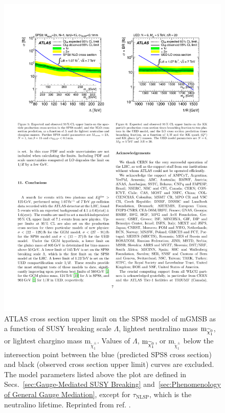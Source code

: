\documentclass[dissertation.tex]{subfiles}
\begin{document}
\begin{figure}
	\centering
	\includegraphics[scale=0.9]{ATLAS_SPS8_limit}
	\caption{ATLAS cross section upper limit on the SPS8 \cite{SPS} model of mGMSB as a function of SUSY breaking scale $\Lambda$, lightest neutralino mass $\mbox{m}_{\widetilde{\chi}_{1}^{0}}$, or lightest chargino mass $\mbox{m}_{\widetilde{\chi}_{1}^{\pm}}$.  Values of $\Lambda$, $\mbox{m}_{\widetilde{\chi}_{1}^{0}}$, or $\mbox{m}_{\widetilde{\chi}_{1}^{\pm}}$ below the intersection point between the blue (predicted SPS8 cross section) and black (observed cross section upper limit) curves are excluded.  The model parameters listed above the plot are defined in Secs.~\ref{sec:Gauge-Mediated SUSY Breaking} and~\ref{sec:Phenomenology of General Gauge Mediation}, except for $\tau_{\mathrm{NLSP}}$, which is the neutralino lifetime.  Reprinted from ref. \cite{ATLAS_GMSB_1fb-1}.}
	\label{fig:ATLAS_SPS8_limit}
\end{figure}
\end{document}
